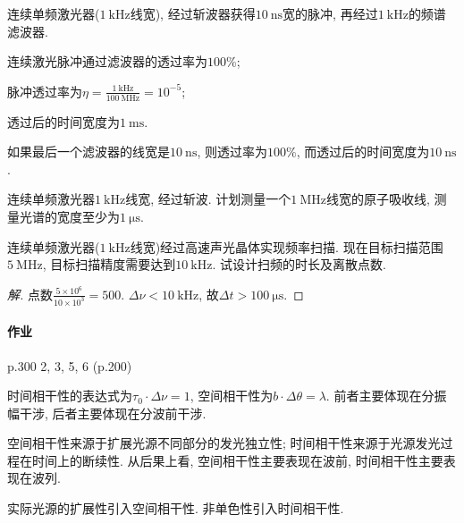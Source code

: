 \documentclass{ctexart}
\begin{document}
\begin{sample}
    \begin{ex}
        连续单频激光器($\SI{1}{\kilo\hertz}$线宽), 经过斩波器获得$\SI{10}{\nano\second}$宽的脉冲, 再经过$\SI{1}{\kilo\hertz}$的频谱滤波器.
        \begin{cenum}
            \item 连续激光脉冲通过滤波器的透过率为$100$\%;
            \item 脉冲透过率为$\eta = \displaystyle \frac{\SI{1}{\kilo\hertz}}{\SI{100}{\mega\hertz}} = 10^{-5}$;
            \item 透过后的时间宽度为$\SI{1}{\milli\second}$.
            \item 如果最后一个滤波器的线宽是$\SI{10}{\nano\second}$, 则透过率为$100\%$, 而透过后的时间宽度为$\SI{10}{\nano\second}$.
        \end{cenum}
    \end{ex}
\end{sample}
\begin{sample}
    \begin{ex}
        连续单频激光器$\SI{1}{\kilo\hertz}$线宽, 经过斩波. 计划测量一个$\SI{1}{\mega\hertz}$线宽的原子吸收线, 测量光谱的宽度至少为$\SI{1}{\micro\second}$.
    \end{ex}
\end{sample}
\begin{sample}
    \begin{ex}
        连续单频激光器($\SI{1}{\kilo\hertz}$线宽)经过高速声光晶体实现频率扫描. 现在目标扫描范围$\SI{5}{\mega\hertz}$, 目标扫描精度需要达到$\SI{10}{\kilo\hertz}$. 试设计扫频的时长及离散点数.
    \end{ex}
    \begin{proof}[解]
        点数$\displaystyle \frac{5\times 10^6}{10\times 10^3} = 500$. $\Delta \nu < \SI{10}{\kilo\hertz}$, 故$\Delta t > \SI{100}{\micro\second}$.
    \end{proof}
\end{sample}

\paragraph{作业} %
\label{par:作业}

p.300 2, 3, 5, 6 (p.200)


\par
时间相干性的表达式为$\tau_0 \cdot \Delta \nu = 1$, 空间相干性为$b\cdot \Delta \theta = \lambda$. 前者主要体现在分振幅干涉, 后者主要体现在分波前干涉.
\par
空间相干性来源于扩展光源不同部分的发光独立性; 时间相干性来源于光源发光过程在时间上的断续性. 从后果上看, 空间相干性主要表现在波前, 时间相干性主要表现在波列.
\par
实际光源的扩展性引入空间相干性. 非单色性引入时间相干性.
\end{document}

